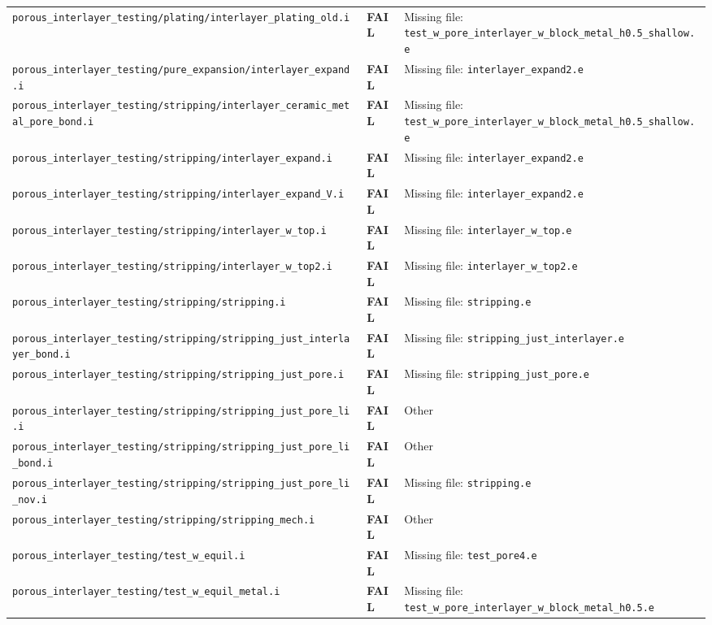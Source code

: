 \documentclass[10pt,letterpaper]{article}
\newcommand{\FAIL}{\textcolor{failred}{\textbf{FAIL}}}
\newcommand{\code}[1]{\texttt{\small #1}}
\begin{document}
\begin{longtable}{p{} l p{}}
\code{porous\_interlayer\_testing/plating/interlayer\_plating\_old.i} & \FAIL & Missing file: \code{test\_w\_pore\_interlayer\_w\_block\_metal\_h0.5\_shallow.e} \\
\code{porous\_interlayer\_testing/pure\_expansion/interlayer\_expand.i} & \FAIL & Missing file: \code{interlayer\_expand2.e} \\
\code{porous\_interlayer\_testing/stripping/interlayer\_ceramic\_metal\_pore\_bond.i} & \FAIL & Missing file: \code{test\_w\_pore\_interlayer\_w\_block\_metal\_h0.5\_shallow.e} \\
\code{porous\_interlayer\_testing/stripping/interlayer\_expand.i} & \FAIL & Missing file: \code{interlayer\_expand2.e} \\
\code{porous\_interlayer\_testing/stripping/interlayer\_expand\_V.i} & \FAIL & Missing file: \code{interlayer\_expand2.e} \\
\code{porous\_interlayer\_testing/stripping/interlayer\_w\_top.i} & \FAIL & Missing file: \code{interlayer\_w\_top.e} \\
\code{porous\_interlayer\_testing/stripping/interlayer\_w\_top2.i} & \FAIL & Missing file: \code{interlayer\_w\_top2.e} \\
\code{porous\_interlayer\_testing/stripping/stripping.i} & \FAIL & Missing file: \code{stripping.e} \\
\code{porous\_interlayer\_testing/stripping/stripping\_just\_interlayer\_bond.i} & \FAIL & Missing file: \code{stripping\_just\_interlayer.e} \\
\code{porous\_interlayer\_testing/stripping/stripping\_just\_pore.i} & \FAIL & Missing file: \code{stripping\_just\_pore.e} \\
\code{porous\_interlayer\_testing/stripping/stripping\_just\_pore\_li.i} & \FAIL & Other \\
\code{porous\_interlayer\_testing/stripping/stripping\_just\_pore\_li\_bond.i} & \FAIL & Other \\
\code{porous\_interlayer\_testing/stripping/stripping\_just\_pore\_li\_nov.i} & \FAIL & Missing file: \code{stripping.e} \\
\code{porous\_interlayer\_testing/stripping/stripping\_mech.i} & \FAIL & Other \\
\code{porous\_interlayer\_testing/test\_w\_equil.i} & \FAIL & Missing file: \code{test\_pore4.e} \\
\code{porous\_interlayer\_testing/test\_w\_equil\_metal.i} & \FAIL & Missing file: \code{test\_w\_pore\_interlayer\_w\_block\_metal\_h0.5.e} \\

\end{longtable}
\end{document}
